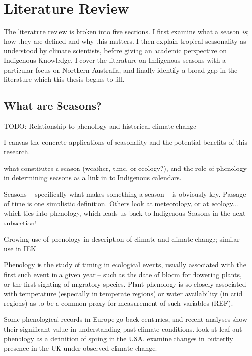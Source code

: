 \chapter{Literature Review}
\label{ch:lit-review}

The literature review is broken into five sections.  I first examine
what a season \emph{is}; how they are defined and why this matters.
I then explain tropical seasonality as understood by climate scientists,
before giving an academic perspective on Indigenous Knowledge.
I cover the literature on Indigenous seasons with a particular
focus on Northern Australia, and finally identify a broad gap in the
literature which this thesis begins to fill.



\section{What are Seasons?}

TODO: Relationship to phenology and historical climate change

I canvas the concrete applications of 
seasonality and the potential benefits of this research.

what constitutes a season (weather, time, or ecology?),
and the role of phenology in determining seasons as a link in to Indigenous 
calendars.

Seasons – specifically what makes something a season – is obviously key.  
Passage of time is one simplistic definition.  Others look at meteorology, or 
at ecology... which ties into phenology, which leads us back to Indigenous
Seasons in the next subsection!


Growing use of phenology in description of climate and climate change; similar 
use in IEK

Phenology is the study of timing in ecological events, usually associated with 
the first such event in a given year – such as the date of bloom for flowering 
plants, or the first sighting of migratory species.  Plant phenology is so 
closely associated with temperature (especially in temperate regions) or water 
availability (in arid regions) as to be a common proxy for measurement of such 
variables (REF).

Some phenological records in Europe go back centuries, and recent analyses show 
their significant value in understanding past climate conditions.
\citet{allstadt2015} look at leaf-out phenology as a definition of spring 
in the USA.  \citet{menzel2006} examine changes in butterfly presence in the
UK under observed climate change.




